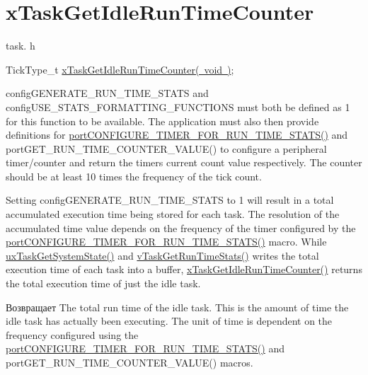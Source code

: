 \hypertarget{group__x_task_get_idle_run_time_counter}{}\section{x\+Task\+Get\+Idle\+Run\+Time\+Counter}
\label{group__x_task_get_idle_run_time_counter}
task. h 
\begin{DoxyPre}TickType\_t \mbox{\hyperlink{task_8h_adcf1216358a193db9dea4ccdccd85dfd}{xTaskGetIdleRunTimeCounter( void )}};\end{DoxyPre}


config\+G\+E\+N\+E\+R\+A\+T\+E\+\_\+\+R\+U\+N\+\_\+\+T\+I\+M\+E\+\_\+\+S\+T\+A\+TS and config\+U\+S\+E\+\_\+\+S\+T\+A\+T\+S\+\_\+\+F\+O\+R\+M\+A\+T\+T\+I\+N\+G\+\_\+\+F\+U\+N\+C\+T\+I\+O\+NS must both be defined as 1 for this function to be available. The application must also then provide definitions for \mbox{\hyperlink{_free_r_t_o_s_8h_a727939bcdb98501e0eba0ec8a1841e1b}{port\+C\+O\+N\+F\+I\+G\+U\+R\+E\+\_\+\+T\+I\+M\+E\+R\+\_\+\+F\+O\+R\+\_\+\+R\+U\+N\+\_\+\+T\+I\+M\+E\+\_\+\+S\+T\+A\+T\+S()}} and port\+G\+E\+T\+\_\+\+R\+U\+N\+\_\+\+T\+I\+M\+E\+\_\+\+C\+O\+U\+N\+T\+E\+R\+\_\+\+V\+A\+L\+U\+E() to configure a peripheral timer/counter and return the timers current count value respectively. The counter should be at least 10 times the frequency of the tick count.

Setting config\+G\+E\+N\+E\+R\+A\+T\+E\+\_\+\+R\+U\+N\+\_\+\+T\+I\+M\+E\+\_\+\+S\+T\+A\+TS to 1 will result in a total accumulated execution time being stored for each task. The resolution of the accumulated time value depends on the frequency of the timer configured by the \mbox{\hyperlink{_free_r_t_o_s_8h_a727939bcdb98501e0eba0ec8a1841e1b}{port\+C\+O\+N\+F\+I\+G\+U\+R\+E\+\_\+\+T\+I\+M\+E\+R\+\_\+\+F\+O\+R\+\_\+\+R\+U\+N\+\_\+\+T\+I\+M\+E\+\_\+\+S\+T\+A\+T\+S()}} macro. While \mbox{\hyperlink{task_8h_aa4603f3de3d809e9beb18d10fbac005d}{ux\+Task\+Get\+System\+State()}} and \mbox{\hyperlink{task_8h_a52da9b427041a48dc9f6802e10f151d4}{v\+Task\+Get\+Run\+Time\+Stats()}} writes the total execution time of each task into a buffer, \mbox{\hyperlink{task_8h_adcf1216358a193db9dea4ccdccd85dfd}{x\+Task\+Get\+Idle\+Run\+Time\+Counter()}} returns the total execution time of just the idle task.

\begin{DoxyReturn}{Возвращает}
The total run time of the idle task. This is the amount of time the idle task has actually been executing. The unit of time is dependent on the frequency configured using the \mbox{\hyperlink{_free_r_t_o_s_8h_a727939bcdb98501e0eba0ec8a1841e1b}{port\+C\+O\+N\+F\+I\+G\+U\+R\+E\+\_\+\+T\+I\+M\+E\+R\+\_\+\+F\+O\+R\+\_\+\+R\+U\+N\+\_\+\+T\+I\+M\+E\+\_\+\+S\+T\+A\+T\+S()}} and port\+G\+E\+T\+\_\+\+R\+U\+N\+\_\+\+T\+I\+M\+E\+\_\+\+C\+O\+U\+N\+T\+E\+R\+\_\+\+V\+A\+L\+U\+E() macros. 
\end{DoxyReturn}
